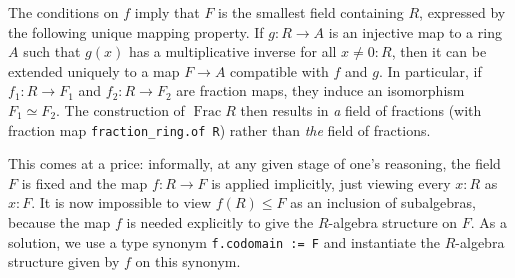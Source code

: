 \documentclass[a4paper,USenglish,cleveref, autoref, thm-restate]{lipics-v2021}
\newcommand{\lean}[1]{\texttt{#1}\xspace} %
\newcommand{\Q}{\mathbb{Q}}
\newcommand{\Z}{\mathbb{Z}}
\DeclareMathOperator{\Frac}{Frac}
\begin{document}
The conditions on $f$ imply that $F$ is the smallest field containing $R$, expressed by the following unique mapping property.
If $g \colon R \to A$ is an injective map to a ring $A$ such that $g(x)$ has a multiplicative inverse for all $x \ne 0 : R$, then
it can be extended uniquely to a map $F \to A$ compatible with $f$ and $g$.
In particular, if $f_1 \colon R \to F_1$ and $f_2 \colon R \to F_2$ are fraction maps, they induce an isomorphism $F_1 \simeq F_2$.
The construction of $\Frac R$ then results in \emph{a} field of fractions (with fraction map \lean{fraction\_ring.of R}) rather than \emph{the} field of fractions.


This comes at a price: %
informally, at any given stage of one's reasoning, the field $F$ is fixed and the map $f\colon R\to F$ is applied implicitly, just viewing every $x:R$ as $x:F$.
It is now impossible to view $f(R) \leq F$ as an inclusion of subalgebras,
because the map $f$ is needed explicitly to give the $R$-algebra structure on $F$.
As a solution, we use a type synonym \lean{f.codomain := F} and instantiate the $R$-algebra structure given by $f$ on this synonym.

\end{document}
